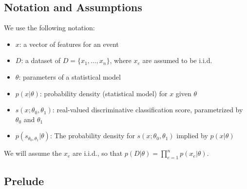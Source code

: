 \documentclass[11pt, oneside]{article}   	%
\begin{document}

  

\subsection{Notation and Assumptions}

We use the following notation:
\begin{itemize}
 \item $x$: a vector of features for an event
 \item $D$: a dataset of $D=\{x_1, \dots, x_n\}$, where $x_e$ are assumed to be i.i.d.
 \item $\theta$: parameters of a statistical model
\item $p(x| \theta)$:  probability density  (statistical model) for $x$ given $\theta$
\item $s(x;\theta_0, \theta_1)$: real-valued discriminative classification score, parametrized by $\theta_0$ and $\theta_1$
\item $p( s_{\theta_0, \theta_1} | \theta )$: The probability density  for $s(x; \theta_0, \theta_1)$ implied by $p(x|\theta)$ \end{itemize}
We will assume the $x_e$ are i.i.d., so that $p(D|\theta) = \prod_{e=1}^n p(x_e | \theta)$.

\subsection{Prelude}
\end{document}
